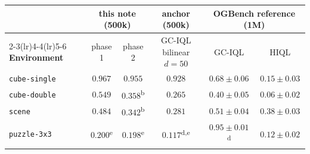 \documentclass[10pt]{article}
\begin{document}
\begin{table}[h]
\centering
\small
\setlength{\tabcolsep}{5pt}
\renewcommand{\arraystretch}{1.15}
\begin{tabular}{l cc c cc}
\toprule
 & \multicolumn{2}{c}{\textbf{this note (500k)}} & \textbf{anchor (500k)} & \multicolumn{2}{c}{\textbf{OGBench reference (1M)}} \\
\cmidrule(lr){2-3}\cmidrule(lr){4-4}\cmidrule(lr){5-6}
\textbf{Environment} & phase 1 & phase 2 & GC-IQL bilinear $d{=}50$ & GC-IQL & HIQL \\
\midrule
\texttt{cube-single}  & $\mathbf{0.967}$ & $0.955$ & $0.928$ & $0.68\pm0.06$ & $0.15\pm0.03$ \\
\texttt{cube-double}  & $\mathbf{0.549}$ & $0.358$\textsuperscript{b} & $0.265$ & $0.40\pm0.05$ & $0.06\pm0.02$ \\
\texttt{scene}        & $\mathbf{0.484}$ & $0.342$\textsuperscript{b} & $0.281$ & $0.51\pm0.04$ & $0.38\pm0.03$ \\
\texttt{puzzle-3x3}   & $\mathbf{0.200}$\textsuperscript{e} & $0.198$\textsuperscript{e} & $0.117$\textsuperscript{d,e} & $0.95\pm0.01$\textsuperscript{d} & $0.12\pm0.02$ \\
\bottomrule
\end{tabular}


\end{table}
\end{document}
